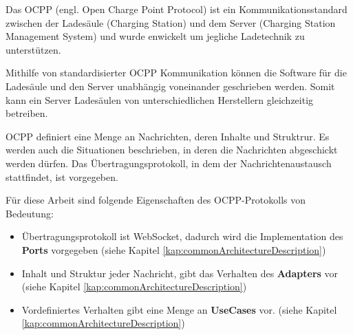 Das OCPP (engl. Open Charge Point Protocol) ist ein Kommunikationsstandard zwischen der Ladesäule (Charging Station) und dem Server (Charging Station Management System)
und wurde enwickelt um jegliche Ladetechnik zu unterstützen.\cite[Part 0, 3. Seite]{ocppDocs}

Mithilfe von standardisierter OCPP Kommunikation können die Software für die Ladesäule und den Server unabhängig voneinander geschrieben werden.
Somit kann ein Server Ladesäulen von unterschiedlichen Herstellern gleichzeitig betreiben.

OCPP definiert eine Menge an Nachrichten, deren Inhalte und Struktrur. 
Es werden auch die Situationen beschrieben, in deren die Nachrichten abgeschickt werden dürfen.
Das Übertragungsprotokoll, in dem der Nachrichtenaustausch stattfindet, ist vorgegeben.

Für diese Arbeit sind folgende Eigenschaften des OCPP-Protokolls von Bedeutung:
\begin{itemize}
    \item Übertragungsprotokoll ist WebSocket, dadurch wird die Implementation des \textbf{Ports} vorgegeben (siehe Kapitel \ref{kap:commonArchitectureDescription})
    \item Inhalt und Struktur jeder Nachricht, gibt das Verhalten des \textbf{Adapters} vor (siehe Kapitel \ref{kap:commonArchitectureDescription})
    \item Vordefiniertes Verhalten gibt eine Menge an \textbf{UseCases} vor. (siehe Kapitel \ref{kap:commonArchitectureDescription})
\end{itemize}
